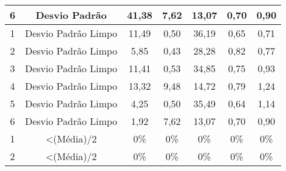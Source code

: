 \begin{table}[]
\begin{tabular}{|c|c|ccccc|}
6                         & Desvio Padrão                                                              & 41,38                      & 7,62                       & 13,07                      & 0,70                       & 0,90                        \\ \hline
1                         & Desvio Padrão Limpo                                                        & 11,49                      & 0,50                       & 36,19                      & 0,65                       & 0,71                        \\
2                         & Desvio Padrão Limpo                                                        & 5,85                       & 0,43                       & 28,28                      & 0,82                       & 0,77                        \\
3                         & Desvio Padrão Limpo                                                        & 11,41                      & 0,53                       & 34,85                      & 0,75                       & 0,93                        \\
4                         & Desvio Padrão Limpo                                                        & 13,32                      & 9,48                       & 14,72                      & 0,79                       & 1,24                        \\
5                         & Desvio Padrão Limpo                                                        & 4,25                       & 0,50                       & 35,49                      & 0,64                       & 1,14                        \\
6                         & Desvio Padrão Limpo                                                        & 1,92                       & 7,62                       & 13,07                      & 0,70                       & 0,90                        \\ \hline
1                         & \textless (Média)/2                                                        & 0\%                     & 0\%                     & 0\%                     & 0\%                     & 0\%                      \\
2                         & \textless (Média)/2                                                        & 0\%                     & 0\%                     & 0\%                     & 0\%                     & 0\%                      \\

\end{tabular}
\end{table}

